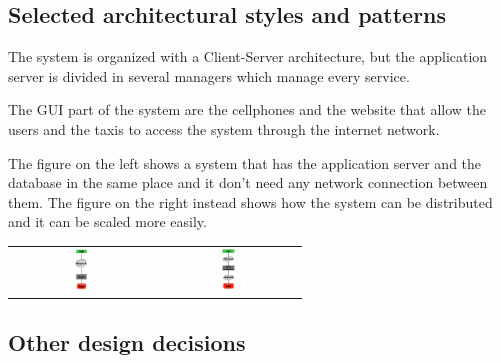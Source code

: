 \subsection{Selected architectural styles and patterns}
	The system is organized with a Client-Server architecture, but the application server is divided in several managers which manage every service. 
	
	The GUI part of the system are the cellphones and the website that allow the users and the taxis to access the system through the internet network.
	
	The figure on the left shows a system that has the application server and the database in the same place and it don't need any network connection between them. The figure on the right instead shows how the system can be distributed and it can be scaled more easily.
	\begin{center}
	    \begingroup
	    	\setlength{\tabcolsep}{30pt}
		    	\begin{tabular}{ c | c }
			    	\includegraphics[width=0.10\textwidth]{./images/architecture1.png} & 	
			    	\includegraphics[width=0.10\textwidth]{./images/architecture2.png}  \\ 
		    	\end{tabular} 
		\endgroup
	\end{center}	  	
\subsection{Other design decisions}
